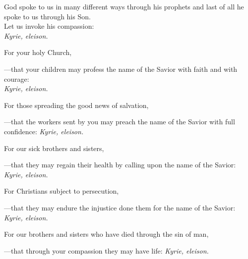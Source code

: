 \intercessions\indent

\begin{hangpar}

  God spoke to us in many different ways through his
  prophets and last of all he spoke to us through his Son.\\
  Let us invoke his compassion:\\
  \emph{Kyrie, eleison.}

\medskip For your holy Church,

{\color{red}---\thinspace}that your children may profess the name of the Savior with faith and with courage:\\
\emph{Kyrie, eleison.}

\medskip For those spreading the good news of salvation,

{\color{red}---\thinspace}that the workers sent by you may preach the name of the Savior with full confidence:
\emph{Kyrie, eleison.}

\medskip For our sick brothers and sisters,

{\color{red}---\thinspace}that they may regain their health by calling upon the name of the Savior:
\emph{Kyrie, eleison.}

\medskip For Christians subject to persecution,

{\color{red}---\thinspace}that they may endure the injustice done them for the name of the Savior:
\emph{Kyrie, eleison.}

\medskip For our brothers and sisters who have died through the sin of man,

{\color{red}---\thinspace}that through your compassion they may have life:
\emph{Kyrie, eleison.}

\medskip

\end{hangpar}
